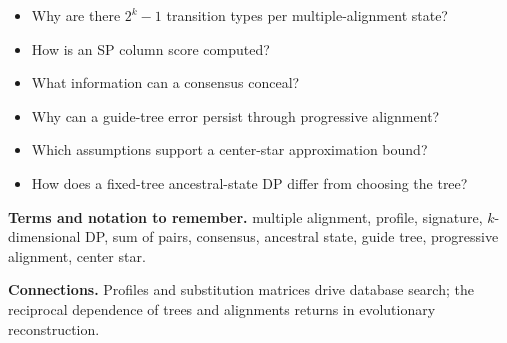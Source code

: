 \documentclass[11pt]{article}
\begin{document}
\begin{tcolorbox}[enhanced,breakable,title={Self-test questions},
  colback=white,colframe=Accent,fonttitle=\small\sffamily\bfseries,fontupper=\footnotesize,
  boxsep=0.6mm,left=1.5mm,right=1.5mm,top=1mm,bottom=1mm,before skip=3pt,after skip=3pt]
\begin{itemize}
  \item Why are there $2^k-1$ transition types per multiple-alignment state?
  \item How is an SP column score computed?
  \item What information can a consensus conceal?
  \item Why can a guide-tree error persist through progressive alignment?
  \item Which assumptions support a center-star approximation bound?
  \item How does a fixed-tree ancestral-state DP differ from choosing the tree?
\end{itemize}
\end{tcolorbox}

{\footnotesize
\textbf{Terms and notation to remember.} multiple alignment, profile, signature, $k$-dimensional DP, sum of pairs, consensus, ancestral state, guide tree, progressive alignment, center star.

\textbf{Connections.} Profiles and substitution matrices drive database search; the reciprocal dependence of trees and alignments returns in evolutionary reconstruction.
}
\end{document}
